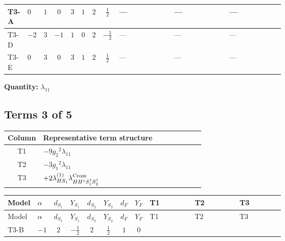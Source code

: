 \documentclass[8pt]{article}
\begin{document}
\begin{landscape}
\begin{longtable}{@{}llcccccc >{\raggedright\arraybackslash}p{0.21\linewidth} >{\raggedright\arraybackslash}p{0.21\linewidth} >{\raggedright\arraybackslash}p{0.21\linewidth}@{}}
\midrule
T3-A & $0$ & $1$ & $0$ & $3$ & $1$ & $2$ & $\frac{1}{2}$ & --- & --- & --- \\
\midrule
T3-D & $-2$ & $3$ & $-1$ & $1$ & $0$ & $2$ & $-\frac{1}{2}$ & --- & --- & --- \\
\midrule
T3-E & $0$ & $3$ & $0$ & $3$ & $1$ & $2$ & $\frac{1}{2}$ & --- & --- & --- \\
\midrule
\bottomrule
\end{longtable}
\clearpage
\noindent\textbf{Quantity: }$\lambda_{11}$\par\smallskip
\subsection*{Terms 3 of 5}
\begin{center}
\begin{tabular}{@{}c >{\raggedright\arraybackslash}p{0.82\linewidth}@{}}
\toprule
Column & Representative term structure \\
\midrule
T1 & \(\displaystyle -9 {g_2}^2 {\lambda_{11}}\) \\
\midrule
T2 & \(\displaystyle -3 {g_1}^2 {\lambda_{11}}\) \\
\midrule
T3 & \(\displaystyle +2 {\lambda_{HS_1}^{(1)}} {\lambda_{H H^\dagger S_1^\dagger S_2^\dagger}^{\rm Cross}}\) \\
\midrule
\bottomrule
\end{tabular}
\end{center}
\smallskip
\tiny
\begin{longtable}{@{}llcccccc >{\raggedright\arraybackslash}p{0.21\linewidth} >{\raggedright\arraybackslash}p{0.21\linewidth} >{\raggedright\arraybackslash}p{0.21\linewidth}@{}}
\toprule
Model & $\alpha$ & $d_{S_1}$ & $Y_{S_1}$ & $d_{S_2}$ & $Y_{S_2}$ & $d_F$ & $Y_F$ & T1 & T2 & T3 \\
\midrule
\endfirsthead
\toprule
Model & $\alpha$ & $d_{S_1}$ & $Y_{S_1}$ & $d_{S_2}$ & $Y_{S_2}$ & $d_F$ & $Y_F$ & T1 & T2 & T3 \\
\midrule
\endhead
T3-B & $-1$ & $2$ & $-\frac{1}{2}$ & $2$ & $\frac{1}{2}$ & $1$ & $0$ & \scriptsize\adjustbox{max width=\linewidth}{$\begin{gathered} -9 {g_2}^2 {\lambda_{11}}\end{gathered}$} & \scriptsize\adjustbox{max width=\linewidth}{$\begin{gathered} -3 {g_1}^2 {\lambda_{11}}\end{gathered}$} & \scriptsize\adjustbox{max width=\linewidth}{$\begin{gathered} +2 {\lambda_{HS_1}^{(1)}} {\lambda_{H H^\dagger S_1^\dagger S_2^\dagger}^{\rm Cross}}\end{gathered}$} \\

\end{longtable}
\end{landscape}
\end{document}
